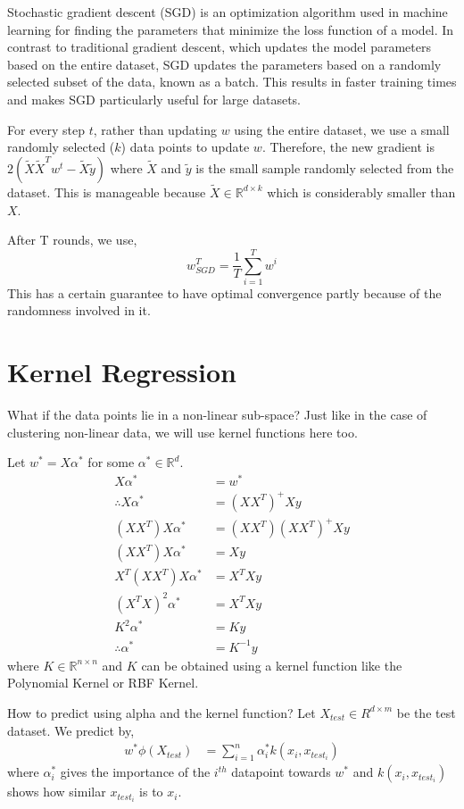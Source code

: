 \documentclass[
]{article}
\begin{document}
Stochastic gradient descent (SGD) is an optimization algorithm used in
machine learning for finding the parameters that minimize the loss
function of a model. In contrast to traditional gradient descent, which
updates the model parameters based on the entire dataset, SGD updates
the parameters based on a randomly selected subset of the data, known as
a batch. This results in faster training times and makes SGD
particularly useful for large datasets.

For every step \(t\), rather than updating \(w\) using the entire
dataset, we use a small randomly selected (\(k\)) data points to update
\(w\). Therefore, the new gradient is
\(2(\tilde{X}\tilde{X}^Tw^t - \tilde{X}\tilde{y})\) where \(\tilde{X}\)
and \(\tilde{y}\) is the small sample randomly selected from the
dataset. This is manageable because
\(\tilde{X} \in \mathbb{R}^{d \times k}\) which is considerably smaller
than \(X\).

After T rounds, we use, \[
w ^T _{SGD} = \frac{1}{T}  \sum _{i=1} ^T w^i
\] This has a certain guarantee to have optimal convergence partly
because of the randomness involved in it.

\hypertarget{kernel-regression}{%
\section{Kernel Regression}\label{kernel-regression}}

What if the data points lie in a non-linear sub-space? Just like in the
case of clustering non-linear data, we will use kernel functions here
too.

Let \(w^* = X\alpha^*\) for some \(\alpha^* \in \mathbb{R}^d\).
\begin{align*}
X\alpha^*&=w^*\\
\therefore X\alpha^* &=(XX^T)^+Xy \\
(XX^T)X\alpha^* &=(XX^T)(XX^T)^+Xy \\
(XX^T)X\alpha^* &=Xy \\
X^T(XX^T)X\alpha^* &=X^TXy \\
(X^TX)^2\alpha^* &=X^TXy \\
K^2\alpha^* &=Ky \\
\therefore \alpha^* &=K^{-1}y
\end{align*} where \(K \in \mathbb{R}^{n \times n}\) and \(K\) can be
obtained using a kernel function like the Polynomial Kernel or RBF
Kernel.

How to predict using alpha and the kernel function? Let
\(X_{test} \in R^{d \times m}\) be the test dataset. We predict by,
\begin{align*}
w^*\phi(X_{test}) &=  \sum _{i=1} ^n \alpha_i^* k(x_i, x_{test_i})
\end{align*} where \(\alpha_i^*\) gives the importance of the \(i^{th}\)
datapoint towards \(w^*\) and \(k(x_i, x_{test_i})\) shows how similar
\(x_{test_i}\) is to \(x_i\).
\end{document}
